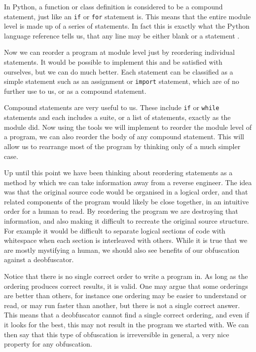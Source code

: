 \documentclass[twoside,a4paper]{report}
\begin{document}
In Python, a function or class definition is considered to be a compound statement, just like an \texttt{if} or \texttt{for} statement is. This
means that the entire module level is made up of a series of statements. In fact this is exactly what the Python language reference tells us, that
any line may be either blank or a statement \cite{fileformat}.

Now we can reorder a program at module level just by reordering individual statements. It would be possible to implement this and be satisfied with
ourselves, but we can do much better. Each statement can be classified as a simple statement such as an assignment or \texttt{import} statement,
which are of no further use to us, or as a compound statement.

Compound statements are very useful to us. These include \texttt{if} or \texttt{while} statements and each includes a suite, or
a list of statements, exactly as the module did. Now using the tools we will implement to reorder the module level of a program, we can also reorder
the body of any compound statement. This will allow us to rearrange most of the program by thinking only of a much simpler case.

Up until this point we have been thinking about reordering statements as a method by which we can take information away from a reverse engineer. The idea was that
the original source code would be organised in a logical order, and that related components of the program would likely be close together, in an intuitive
order for a human to read. By reordering the program we are destroying that information, and also making it difficult to recreate the original source structure. For
example it would be difficult to separate logical sections of code with whitespace when each section is interleaved with others. While it is true that we
are mostly mystifying a human, we should also see benefits of our obfuscation against a deobfuscator.

Notice that there is no single correct order to write a program in. As long as the ordering produces correct results, it is valid. One may argue that
some orderings are better than others, for instance one ordering may be easier to understand or read, or may run faster than another, but there is not
a single correct answer. This means that a deobfuscator cannot find a single correct ordering, and even if it looks for the best, this may not result in
the program we started with. We can then say that this type of obfuscation is irreversible in general, a very nice property for any obfuscation. 
\end{document}
